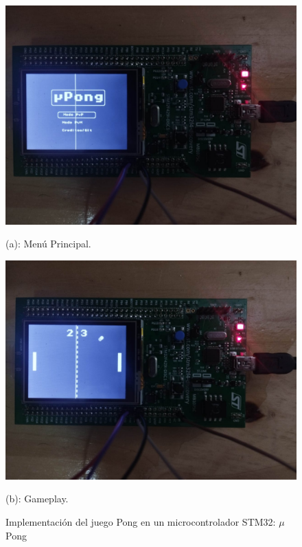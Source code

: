 \begin{figure}[H]
    \centering
    \begin{minipage}{0.45\textwidth}
        \centering
        \includegraphics[width=\textwidth]{figs/justificacion/main_menu.jpeg}
        \caption*{(a): Menú Principal.}
    \end{minipage}%
    \begin{minipage}{0.45\textwidth}
        \centering
        \includegraphics[width=\textwidth]{figs/justificacion/gameplay.jpeg}
        \caption*{(b): Gameplay.}
    \end{minipage}%
    \caption{Implementación del juego Pong en un microcontrolador STM32: $\mu$Pong}
    \label{uPong}
\end{figure}

